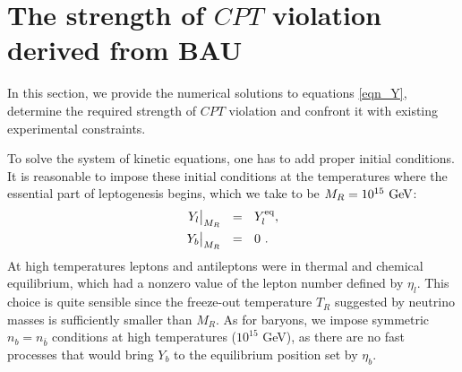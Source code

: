 \documentclass[12pt]{revtex4}
\newcommand{\GeV}{{\rm GeV}}
\begin{document}
%
%
\section{The strength of $CPT$ violation derived from BAU}


In this section, we provide the numerical solutions to equations \eqref{eqn_Y},
determine the required strength of $CPT$ violation and confront it with 
existing experimental constraints.

To solve the system of kinetic equations, one has to add proper initial conditions.
	It is reasonable to impose these initial conditions at the temperatures
	where the essential part of leptogenesis begins, which we
	take to be $ M_R = 10^{15}~\GeV $:
	\begin{eqnarray}
	Y_l\bigl|_{M_R} & ~~=~~ Y_l^{\rm eq}, \\
	Y_b\bigl|_{M_R} & ~~=~~ 0~. \nonumber
\end{eqnarray}
	At high temperatures leptons and antileptons were in thermal and chemical equilibrium, which
	had a nonzero value of the lepton number defined by $ \eta_l $.
	This choice is quite sensible since 
	the freeze-out temperature $ T_R $ suggested by neutrino masses 
    is sufficiently smaller than $ M_R $.
	As for baryons, we impose symmetric $n_b=n_{\bar b}$ conditions 
	at high temperatures ($10^{15}$ GeV), as there are no fast processes that would bring 
$Y_b$ to the equilibrium position set by  $\eta_b$.
\end{document}
